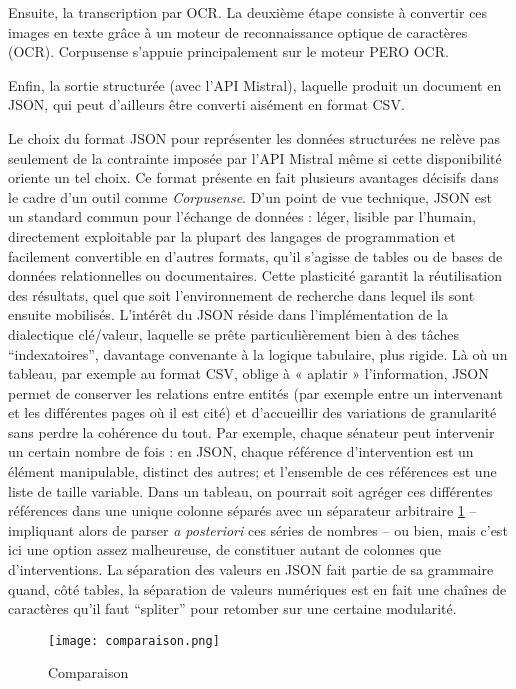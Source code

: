Ensuite, la transcription par OCR. La deuxième étape consiste à convertir ces images en texte grâce à un moteur de reconnaissance optique de caractères (OCR). Corpusense s’appuie principalement sur le moteur PERO OCR. 

Enfin, la sortie structurée (avec l'API Mistral), laquelle produit un document en JSON, qui peut d'ailleurs être converti aisément en format CSV.

Le choix du format JSON pour représenter les données structurées ne relève pas seulement de la contrainte imposée par l’API Mistral même si cette disponibilité oriente un tel choix. Ce format présente en fait plusieurs avantages décisifs dans le cadre d’un outil comme \emph{Corpusense}. D’un point de vue technique, JSON est un standard commun pour l’échange de données : léger, lisible par l’humain, directement exploitable par la plupart des langages de programmation et facilement convertible en d’autres formats, qu’il s’agisse de tables ou de bases de données relationnelles ou documentaires. Cette plasticité garantit la réutilisation des résultats, quel que soit l’environnement de recherche dans lequel ils sont ensuite mobilisés. L’intérêt du JSON réside dans l'implémentation de la dialectique clé/valeur, laquelle se prête particulièrement bien à des tâches \enquote{indexatoires}, davantage convenante à la logique tabulaire, plus rigide. Là où un tableau, par exemple au format CSV, oblige à « aplatir » l’information, JSON permet de conserver les relations entre entités (par exemple entre un intervenant et les différentes pages où il est cité) et d’accueillir des variations de granularité sans perdre la cohérence du tout. Par exemple, chaque sénateur peut intervenir un certain nombre de fois : en JSON, chaque référence d'intervention est un élément manipulable, distinct des autres; et l'ensemble de ces références est une liste de taille variable. Dans un tableau, on pourrait soit agréger ces différentes références dans une unique colonne séparés avec un séparateur arbitraire \ref{fig:comparaison} -- impliquant alors de parser \emph{a posteriori} ces séries de nombres -- ou bien, mais c'est ici une option assez malheureuse, de constituer autant de colonnes que d'interventions. La séparation des valeurs en JSON fait partie de sa grammaire quand, côté tables, la séparation de valeurs numériques est en fait une chaînes de caractères qu'il faut \enquote{spliter} pour retomber sur une certaine modularité.

\begin{figure}[htbp]
\centering
\texttt{[image: comparaison.png]}
\caption{Comparaison}
\label{fig:comparaison}
\end{figure}

